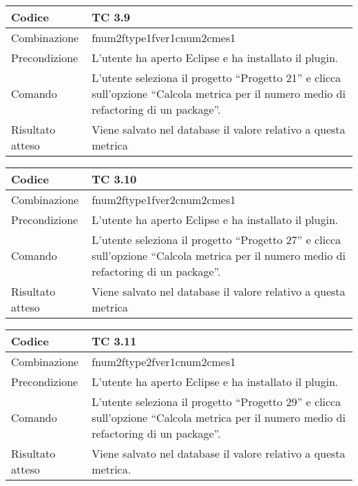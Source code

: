 \begin{table}[ht]
\begin{tabular}{|p{3cm}|p{9cm}|}
\hline
\cellcolor{lightgray}Codice				& TC 3.9								\\
\hline
\cellcolor{lightgray}Combinazione		& fnum2ftype1fver1cnum2cmes1 									\\
\hline
\cellcolor{lightgray}Precondizione		& L'utente ha aperto Eclipse e ha installato il plugin.								\\
\hline
\cellcolor{lightgray}Comando			& L'utente seleziona il progetto ``Progetto 21''  e clicca sull'opzione ``Calcola metrica per il numero medio di refactoring di un package''.	\\
\hline
\cellcolor{lightgray}Risultato atteso	& Viene salvato nel database il valore relativo a questa metrica	\\
\hline
\end{tabular}
\end{table}

\begin{table}[ht]
\begin{tabular}{|p{3cm}|p{9cm}|}
\hline
\cellcolor{lightgray}Codice				& TC 3.10								\\
\hline
\cellcolor{lightgray}Combinazione		& fnum2ftype1fver2cnum2cmes1 									\\
\hline
\cellcolor{lightgray}Precondizione		& L'utente ha aperto Eclipse e ha installato il plugin.									\\
\hline
\cellcolor{lightgray}Comando			& L'utente seleziona il progetto ``Progetto 27''  e clicca sull'opzione ``Calcola metrica per il numero medio di refactoring di un package''.	\\
\hline
\cellcolor{lightgray}Risultato atteso	& Viene salvato nel database il valore relativo a questa metrica	\\
\hline
\end{tabular}
\end{table}

\clearpage

\begin{table}[ht]
\begin{tabular}{|p{3cm}|p{9cm}|}
\hline
\cellcolor{lightgray}Codice				& TC 3.11								\\
\hline
\cellcolor{lightgray}Combinazione		& fnum2ftype2fver1cnum2cmes1 									\\
\hline
\cellcolor{lightgray}Precondizione		& L'utente ha aperto Eclipse e ha installato il plugin.		\\
\hline
\cellcolor{lightgray}Comando			& L'utente seleziona il progetto ``Progetto 29''  e clicca sull'opzione ``Calcola metrica per il numero medio di refactoring di un package''.	\\
\hline
\cellcolor{lightgray}Risultato atteso	& Viene salvato nel database il valore relativo a questa metrica.\\
\hline
\end{tabular}
\end{table}

